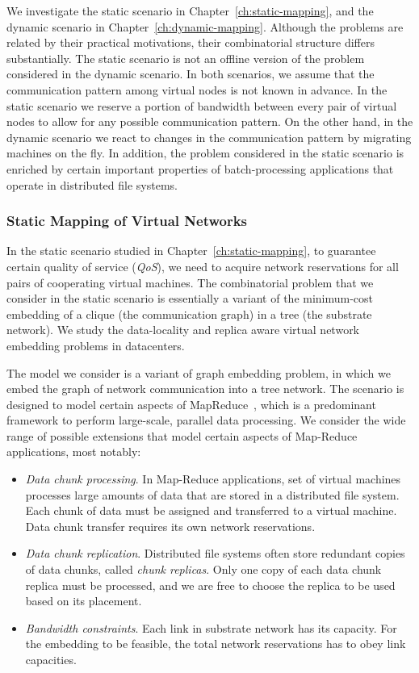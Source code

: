We investigate the static scenario in Chapter~\ref{ch:static-mapping}, and the dynamic scenario in Chapter~\ref{ch:dynamic-mapping}.
Although the problems are related by their practical motivations, their combinatorial structure differs substantially.
The static scenario is not an offline version of the problem considered in the dynamic scenario.
In both scenarios, we assume that the communication pattern among virtual nodes is not known in advance.
In the static scenario we reserve a portion of bandwidth between every pair of virtual nodes to allow for any possible communication pattern.
On the other hand, in the dynamic scenario we react to changes in the communication pattern by migrating machines on the fly.
In addition, the problem considered in the static scenario is enriched by certain important properties of batch-processing applications that operate in distributed file systems.


\subsubsection{Static Mapping of Virtual Networks}
\label{sec:contributions-static-mapping}

In the static scenario studied in Chapter~\ref{ch:static-mapping}, to guarantee certain quality of service (\emph{QoS}), we need to acquire network reservations for all pairs of cooperating virtual machines.
The combinatorial problem that we consider in the static scenario is essentially a variant of the minimum-cost embedding of a clique (the communication graph) in a tree (the substrate network).
We study the data-locality and replica aware virtual network embedding problems in datacenters.

The model we consider is a variant of graph embedding problem, in which we embed the graph of network communication into a tree network.
The scenario is designed to model certain aspects of MapReduce~\cite{mapreduce}, which is a predominant framework to perform large-scale, parallel data processing.
We consider the wide range of possible extensions that model certain aspects of Map-Reduce applications, most notably:

\begin{itemize}
\item \emph{Data chunk processing}. In Map-Reduce applications, set of virtual machines processes large amounts of data that are stored in a distributed file system. Each chunk of data must be assigned and transferred to a virtual machine. Data chunk transfer requires its own network reservations.

\item \emph{Data chunk replication}. Distributed file systems often store redundant copies of data chunks, called \emph{chunk replicas}. Only one copy of each data chunk replica must be processed, and we are free to choose the replica to be used based on its placement.

\item \emph{Bandwidth constraints}. Each link in substrate network has its capacity. For the embedding to be feasible, the total network reservations has to obey link capacities.
\end{itemize}



